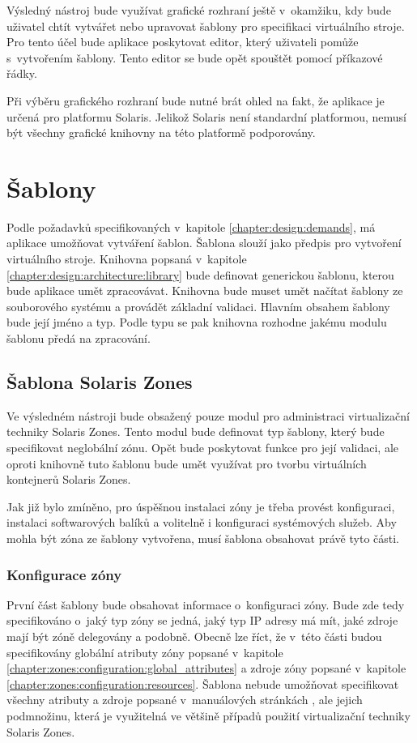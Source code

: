 Výsledný nástroj bude využívat grafické rozhraní ještě v~okamžiku, kdy bude uživatel chtít vytvářet nebo upravovat šablony pro
specifikaci virtuálního stroje. Pro tento účel bude aplikace poskytovat editor, který uživateli pomůže s~vytvořením šablony.
Tento editor se bude opět spouštět pomocí příkazové řádky.

Při výběru grafického rozhraní bude nutné brát ohled na fakt, že aplikace je určená pro platformu Solaris. Jelikož Solaris
není standardní platformou, nemusí být všechny grafické knihovny na této platformě podporovány.
\section{Šablony}
\label{chapter:design:templates}
Podle požadavků specifikovaných v~kapitole \ref{chapter:design:demands}, má aplikace umožňovat vytváření šablon. Šablona slouží
jako předpis pro vytvoření virtuálního stroje. Knihovna popsaná v~kapitole \ref{chapter:design:architecture:library} bude definovat 
generickou šablonu, kterou bude aplikace umět zpracovávat. Knihovna bude muset umět načítat šablony ze souborového systému
a provádět základní validaci. Hlavním obsahem šablony bude její jméno a typ. Podle typu se pak knihovna rozhodne
jakému modulu šablonu předá na zpracování.
\subsection{Šablona Solaris Zones}
\label{chapter:design:templates:zones}
Ve výsledném nástroji bude obsažený pouze modul pro administraci virtualizační techniky Solaris Zones. Tento modul bude
definovat typ šablony, který bude specifikovat neglobální zónu. Opět bude poskytovat funkce pro její validaci, ale oproti
knihovně tuto šablonu bude umět využívat pro tvorbu virtuálních kontejnerů Solaris Zones.

Jak již bylo zmíněno, pro úspěšnou instalaci zóny je třeba provést konfiguraci, instalaci 
softwarových balíků a volitelně i konfiguraci systémových služeb. Aby mohla být zóna ze šablony vytvořena, musí šablona obsahovat
právě tyto části.
\subsubsection{Konfigurace zóny}
\label{chapter:design:templates:zones:configuration}
První část šablony bude obsahovat informace o~konfiguraci zóny. Bude zde tedy specifikováno o~jaký typ zóny se jedná,
jaký typ IP adresy má mít, jaké zdroje mají být zóně delegovány a podobně. Obecně lze říct, že v~této části budou specifikovány
globální atributy zóny popsané v~kapitole \ref{chapter:zones:configuration:global_attributes} a zdroje zóny popsané v~kapitole
\ref{chapter:zones:configuration:resources}. Šablona nebude umožňovat specifikovat všechny atributy a zdroje popsané
v~manuálových stránkách \cite{oracle:manpages:zonecfg}, ale jejich podmnožinu, která je využitelná ve většině případů použití virtualizační
techniky Solaris Zones.
